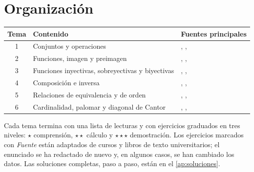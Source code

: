 \documentclass[11pt,a4paper,twoside,openany]{book}
\begin{document}
\section*{Organización}
\begin{center}
\begin{tabular}{@{}cll@{}}
\toprule
Tema & Contenido & Fuentes principales \\
\midrule
1 & Conjuntos y operaciones & \cite{hammack}, \cite{velleman}, \cite{mcs} \\
2 & Funciones, imagen y preimagen & \cite{hammack}, \cite{velleman}, \cite{camns} \\
3 & Funciones inyectivas, sobreyectivas y biyectivas & \cite{hammack}, \cite{velleman}, \cite{cs103ps3} \\
4 & Composición e inversa & \cite{hammack}, \cite{velleman}, \cite{mcs} \\
5 & Relaciones de equivalencia y de orden & \cite{hammack}, \cite{velleman}, \cite{mcs} \\
6 & Cardinalidad, palomar y diagonal de Cantor & \cite{hammack}, \cite{mcs}, \cite{cs103card} \\
\bottomrule
\end{tabular}
\end{center}

Cada tema termina con una lista de lecturas y con ejercicios graduados en tres niveles: $\star$ comprensión, $\star\star$ cálculo y $\star\star\star$ demostración. Los ejercicios marcados con \emph{Fuente} están adaptados de cursos y libros de texto universitarios; el enunciado se ha redactado de nuevo y, en algunos casos, se han cambiado los datos. Las soluciones completas, paso a paso, están en el \cref{ap:soluciones}.
\end{document}
